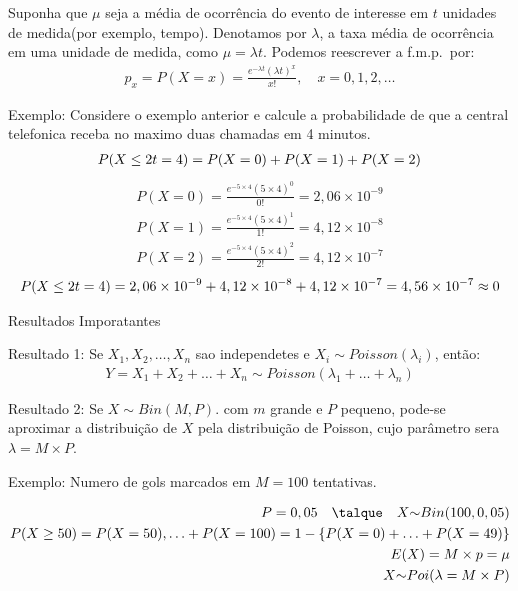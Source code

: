      Suponha que $\mu$ seja a média de ocorrência do evento de interesse
     em $t$ unidades de medida(por exemplo, tempo). Denotamos por $\lambda$,
     a taxa média de ocorrência em uma unidade de medida, como $\mu= \lambda t$.
     Podemos reescrever a f.m.p.\ por:
     \begin{align*}
       p_{x} =P(X=x)= \frac{e^{-\lambda t} \left( \lambda t \right)^{x}}{x!}, \quad x=0,1,2,\ldots
     \end{align*}
     \begin{description} 
       \item{Exemplo}: Considere o exemplo anterior e calcule a probabilidade de que a central 
         telefonica receba no maximo duas chamadas em 4 minutos.
         \begin{align*}
           P(X \leq 2 \/ t=4) = P(X=0)+P(X=1)+P(X=2)
         \end{align*}
     \begin{align*}
       P(X=0) = \frac{e^{-5 \times 4}(5\times 4)^0}{0!}= 2,06 \times 10^{-9}\\
       P(X=1) = \frac{e^{-5 \times 4}(5\times 4)^1}{1!}= 4,12 \times 10^{-8}\\
       P(X=2) = \frac{e^{-5 \times 4}(5\times 4)^2}{2!}= 4,12 \times 10^{-7} 
     \end{align*}
    \begin{align*}
      P(X \leq 2 \/ t=4)= 2,06 \times 10^{-9}+4,12 \times 10^{-8}+4,12 \times 10^{-7} = 4,56 \times 10^{-7} \approx 0
    \end{align*} 
  \item{Resultados Imporatantes}
    \begin{description}
  \item {Resultado 1}: Se $X_1, X_2,\ldots, X_n$ sao independetes e $X_i \mathtt{\sim} Poisson(\lambda_i)$, então:
    \begin{align}
      Y= X_1+X_2+\ldots+X_n \mathtt{\sim} Poisson\left( \lambda_1+\ldots+\lambda_n \right)
    \end{align}
  \item {Resultado 2}: Se $X \mathtt{\sim}Bin(M,P)$. com $m$ grande e $P$ pequeno, pode-se aproximar a distribuição de 
    $X$ pela distribuição de Poisson, cujo parâmetro sera $\lambda = M \times P$.
    \begin{description}
      \item {Exemplo}: Numero de gols marcados em $M=100$ tentativas.

    \begin{align*}
      P=0,05 \quad \talque \quad  X \mathtt{\sim} Bin(100, 0,05) \\
      P(X \ge 50)=P(X=50), \ldots + P(X=100)= 1- \{P(X=0)+\ldots+P(X=49) \}\\
      E(X)=M \times p = \mu\\
      X \mathtt{\sim}Poi(\lambda= M \times P)
    \end{align*}


\end{description}
\end{description}
\end{description}
